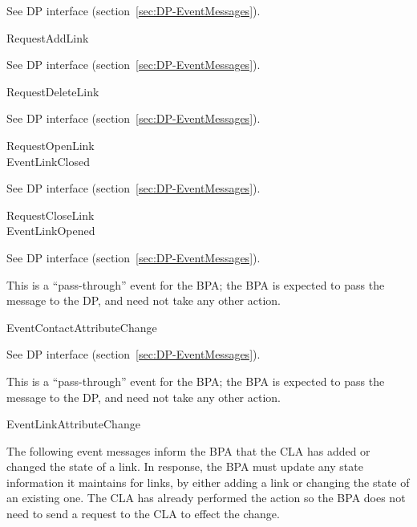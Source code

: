 {
\metD
    See DP interface (section~\ref{sec:DP-EventMessages}).

\metR
    RequestAddLink
}

{
\metD
    See DP interface (section~\ref{sec:DP-EventMessages}).

\metR
    RequestDeleteLink
}

{
\metD
    See DP interface (section~\ref{sec:DP-EventMessages}).

\metR
    RequestOpenLink\\
    EventLinkClosed
}

{
\metD
    See DP interface (section~\ref{sec:DP-EventMessages}).

\metR
    RequestCloseLink\\
    EventLinkOpened
}

{
\metD
    See DP interface (section~\ref{sec:DP-EventMessages}).

    This is a ``pass-through'' event for the BPA; the BPA is expected to
    pass the message to the DP, and need not take any other action.

\metR
    EventContactAttributeChange
}

{
\metD
    See DP interface (section~\ref{sec:DP-EventMessages}).

    This is a ``pass-through'' event for the BPA; the BPA is expected to
    pass the message to the DP, and need not take any other action.

\metR
    EventLinkAttributeChange
}

The following event messages inform the BPA that the CLA has added or changed
the state of a link. In response, the BPA must update any state information it
maintains for links, by either adding a link or changing the state of an
existing one. The CLA has already performed the action so the BPA does not need
to send a request to the CLA to effect the change.\\[1em]

